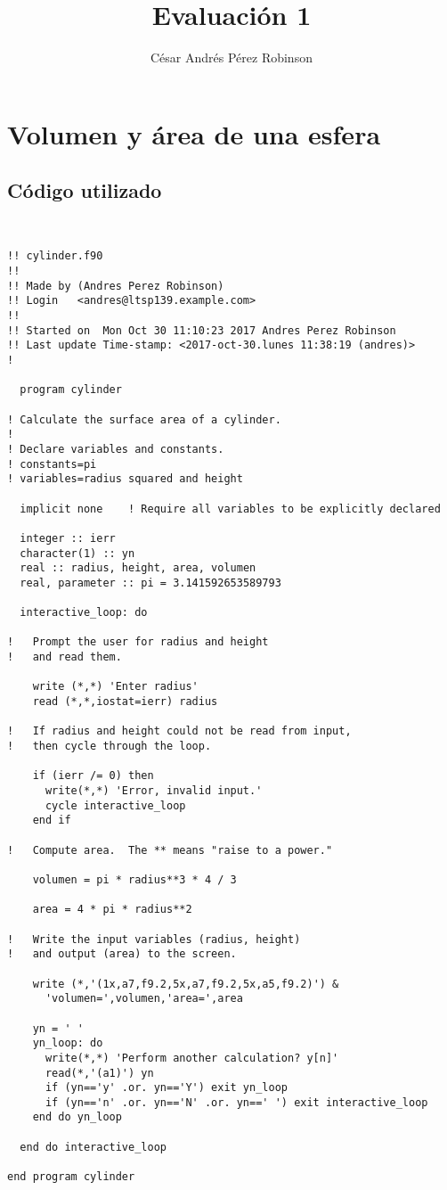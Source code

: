 \documentclass{article}
\title{Evaluación 1}
\author{César Andrés Pérez Robinson}
\begin{document}
\maketitle

\section{Volumen y área de una esfera}

\subsection{Código utilizado}
\begin{verbatim}


!! cylinder.f90
!! 
!! Made by (Andres Perez Robinson)
!! Login   <andres@ltsp139.example.com>
!! 
!! Started on  Mon Oct 30 11:10:23 2017 Andres Perez Robinson
!! Last update Time-stamp: <2017-oct-30.lunes 11:38:19 (andres)>
!

  program cylinder

! Calculate the surface area of a cylinder.
!
! Declare variables and constants.
! constants=pi
! variables=radius squared and height

  implicit none    ! Require all variables to be explicitly declared

  integer :: ierr
  character(1) :: yn
  real :: radius, height, area, volumen
  real, parameter :: pi = 3.141592653589793

  interactive_loop: do

!   Prompt the user for radius and height
!   and read them.

    write (*,*) 'Enter radius'
    read (*,*,iostat=ierr) radius

!   If radius and height could not be read from input,
!   then cycle through the loop.

    if (ierr /= 0) then
      write(*,*) 'Error, invalid input.'
      cycle interactive_loop
    end if

!   Compute area.  The ** means "raise to a power."

    volumen = pi * radius**3 * 4 / 3

    area = 4 * pi * radius**2

!   Write the input variables (radius, height)
!   and output (area) to the screen.

    write (*,'(1x,a7,f9.2,5x,a7,f9.2,5x,a5,f9.2)') &
      'volumen=',volumen,'area=',area

    yn = ' '
    yn_loop: do
      write(*,*) 'Perform another calculation? y[n]'
      read(*,'(a1)') yn
      if (yn=='y' .or. yn=='Y') exit yn_loop
      if (yn=='n' .or. yn=='N' .or. yn==' ') exit interactive_loop
    end do yn_loop

  end do interactive_loop

end program cylinder

\end{verbatim}
\end{document}
